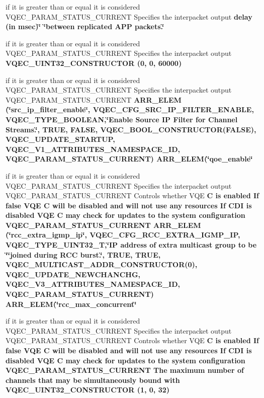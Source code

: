 \begin{CompactItemize}
\item 
if it is greater than or equal it is considered VQEC\_\-PARAM\_\-STATUS\_\-CURRENT Specifies the interpacket output \bf{delay} (in msec)\char`\"{} \char`\"{}between replicated APP packets.\char`\"{}
\item 
if it is greater than or equal it is considered VQEC\_\-PARAM\_\-STATUS\_\-CURRENT Specifies the interpacket output \bf{VQEC\_\-UINT32\_\-CONSTRUCTOR} (0, 0, 60000)
\item 
if it is greater than or equal it is considered VQEC\_\-PARAM\_\-STATUS\_\-CURRENT Specifies the interpacket output VQEC\_\-PARAM\_\-STATUS\_\-CURRENT \bf{ARR\_\-ELEM} (\char`\"{}src\_\-ip\_\-filter\_\-enable\char`\"{}, VQEC\_\-CFG\_\-SRC\_\-IP\_\-FILTER\_\-ENABLE, \bf{VQEC\_\-TYPE\_\-BOOLEAN},\char`\"{}Enable Source IP Filter for Channel Streams.\char`\"{}, TRUE, \bf{FALSE}, VQEC\_\-BOOL\_\-CONSTRUCTOR(\bf{FALSE}), \bf{VQEC\_\-UPDATE\_\-STARTUP}, \bf{VQEC\_\-V1\_\-ATTRIBUTES\_\-NAMESPACE\_\-ID}, VQEC\_\-PARAM\_\-STATUS\_\-CURRENT) ARR\_\-ELEM(\char`\"{}qoe\_\-enable\char`\"{}
\item 
if it is greater than or equal it is considered VQEC\_\-PARAM\_\-STATUS\_\-CURRENT Specifies the interpacket output VQEC\_\-PARAM\_\-STATUS\_\-CURRENT Controls whether VQE \bf{C} is enabled If false VQE \bf{C} will be disabled and will not use any resources If CDI is disabled VQE \bf{C} may check for updates \bf{to} the system configuration VQEC\_\-PARAM\_\-STATUS\_\-CURRENT \bf{ARR\_\-ELEM} (\char`\"{}rcc\_\-extra\_\-igmp\_\-ip\char`\"{}, VQEC\_\-CFG\_\-RCC\_\-EXTRA\_\-IGMP\_\-IP, \bf{VQEC\_\-TYPE\_\-UINT32\_\-T},\char`\"{}IP address of extra multicast group \bf{to} be \char`\"{}\char`\"{}joined during \bf{RCC} burst.\char`\"{}, TRUE, \bf{TRUE}, VQEC\_\-MULTICAST\_\-ADDR\_\-CONSTRUCTOR(0), \bf{VQEC\_\-UPDATE\_\-NEWCHANCHG}, \bf{VQEC\_\-V3\_\-ATTRIBUTES\_\-NAMESPACE\_\-ID}, VQEC\_\-PARAM\_\-STATUS\_\-CURRENT) ARR\_\-ELEM(\char`\"{}rcc\_\-max\_\-concurrent\char`\"{}
\item 
if it is greater than or equal it is considered VQEC\_\-PARAM\_\-STATUS\_\-CURRENT Specifies the interpacket output VQEC\_\-PARAM\_\-STATUS\_\-CURRENT Controls whether VQE \bf{C} is enabled If false VQE \bf{C} will be disabled and will not use any resources If CDI is disabled VQE \bf{C} may check for updates \bf{to} the system configuration VQEC\_\-PARAM\_\-STATUS\_\-CURRENT The maximum number of \bf{channels} that may be simultaneously bound with \bf{VQEC\_\-UINT32\_\-CONSTRUCTOR} (1, 0, 32)
\item 

\end{CompactItemize}
